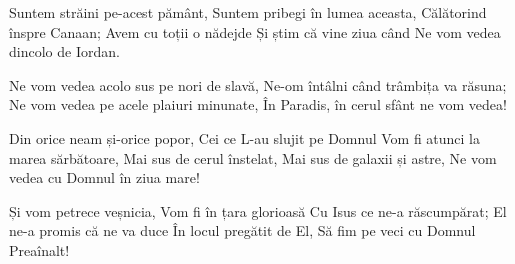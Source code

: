 \beginverse
Suntem străini pe-acest pământ,
Suntem pribegi în lumea aceasta,
Călătorind înspre Canaan;
Avem cu toții o nădejde
Și știm că vine ziua când
Ne vom vedea dincolo de Iordan.
\endverse

\beginchorus
Ne vom vedea acolo sus pe nori de slavă,
Ne-om întâlni când trâmbița va răsuna;
Ne vom vedea pe acele plaiuri minunate,
În Paradis, în cerul sfânt ne vom vedea!
\endchorus

\beginverse
Din orice neam și-orice popor,
Cei ce L-au slujit pe Domnul
Vom fi atunci la marea sărbătoare,
Mai sus de cerul înstelat,
Mai sus de galaxii și astre,
Ne vom vedea cu Domnul în ziua mare!
\endverse

\beginverse
Și vom petrece veșnicia,
Vom fi în țara glorioasă
Cu Isus ce ne-a răscumpărat;
El ne-a promis că ne va duce
În locul pregătit de El,
Să fim pe veci cu Domnul Preaînalt!
\endverse
\endsong
